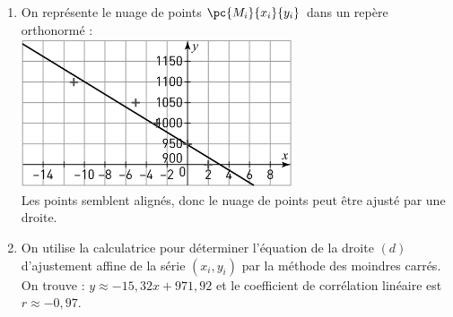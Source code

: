 \documentclass[a4paper,11pt,exos]{nsi} %
\begin{document}
\textcolor{UGLiBlue}{
    \begin{enumerate}
        \item On représente le nuage de points $\pc{M_i}{x_i}{y_i}$ dans un repère orthonormé :\\
        \includegraphics[width=8cm]{Ex23p237Sesamath.png}\\
        Les points semblent alignés, donc le nuage de points peut être ajusté par une droite.
        \item On utilise la calculatrice pour déterminer l'équation de la droite $(d)$ d'ajustement affine de la série $(x_i,y_i)$ par la méthode des moindres carrés.\\
        On trouve : $y\approx -15,32x+971,92$ et le coefficient de corrélation linéaire est $r\approx -0,97$.
    \end{enumerate}
}
\end{document}
